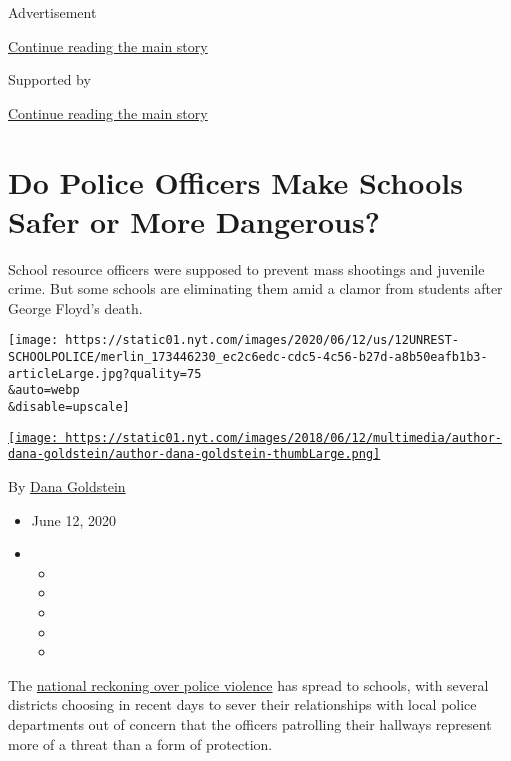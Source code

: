 Advertisement

\protect\hyperlink{after-top}{Continue reading the main story}

Supported by

\protect\hyperlink{after-sponsor}{Continue reading the main story}

\hypertarget{do-police-officers-make-schools-safer-or-more-dangerous}{%
\section{Do Police Officers Make Schools Safer or More
Dangerous?}\label{do-police-officers-make-schools-safer-or-more-dangerous}}

School resource officers were supposed to prevent mass shootings and
juvenile crime. But some schools are eliminating them amid a clamor from
students after George Floyd's death.

\texttt{[image: https://static01.nyt.com/images/2020/06/12/us/12UNREST-SCHOOLPOLICE/merlin\_173446230\_ec2c6edc-cdc5-4c56-b27d-a8b50eafb1b3-articleLarge.jpg?quality=75\\\&auto=webp\\\&disable=upscale]}

\href{https://www.nytimes.com/by/dana-goldstein}{\texttt{[image: https://static01.nyt.com/images/2018/06/12/multimedia/author-dana-goldstein/author-dana-goldstein-thumbLarge.png]}}

By \href{https://www.nytimes.com/by/dana-goldstein}{Dana Goldstein}

\begin{itemize}
\item
  June 12, 2020
\item
  \begin{itemize}
  \item
  \item
  \item
  \item
  \item
  \end{itemize}
\end{itemize}

The
\href{https://www.nytimes.com/news-event/george-floyd-protests-minneapolis-new-york-los-angeles}{national
reckoning over police violence} has spread to schools, with several
districts choosing in recent days to sever their relationships with
local police departments out of concern that the officers patrolling
their hallways represent more of a threat than a form of protection.

